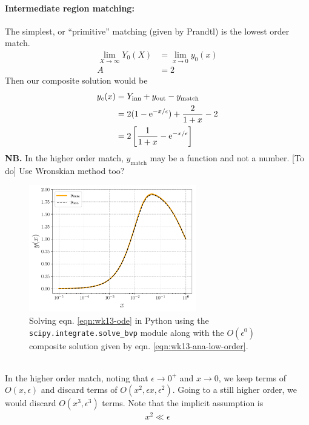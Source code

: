 \paragraph{Intermediate region matching:} The simplest, or ``primitive'' matching (given by Prandtl) is the lowest order match. 
\begin{align*}
	\lim\limits_{X\rightarrow \infty}Y_0(X) &= \lim\limits_{x \rightarrow 0} y_0(x) \\
	A &= 2
\end{align*}
Then our composite solution would be
\begin{align}
	y_c(x) &= Y_\text{inn} + y_\text{out} - y_\text{match} \nonumber \\
	&= 2(1-\mathrm{e}^{-x/\epsilon}) + \frac{2}{1+x} - 2 \nonumber \\
	&= 2\left[\frac{1}{1+x} - \mathrm{e}^{-x/\epsilon}\right] \label{eqn:wk13-ana-low-order}
\end{align}
{\bf NB.} In the higher order match, $y_\text{match}$ may be a function and not a number. {\color{red} [To do]} Use Wronskian method too? 
\begin{figure}[!h]
	\centering
	\includegraphics[width=0.65\textwidth]{./plots/pdf/strogatz-wk13.pdf}
	\caption{Solving eqn. \ref{eqn:wk13-ode} in Python using the \texttt{scipy.integrate.solve\_bvp} module along with the $O(\epsilon^0)$ composite solution given by eqn. \ref{eqn:wk13-ana-low-order}.}
	\label{fig:strogatz-wk13}
\end{figure} \\
In the higher order match, noting that $\epsilon \rightarrow 0^+$ and $x \rightarrow 0$, we keep terms of $O(x,\epsilon)$ and discard terms of $O(x^2, \epsilon x, \epsilon^2)$. Going to a still higher order, we would discard $O(x^3,\epsilon^3)$ terms. Note that the implicit assumption is
\begin{gather*}
	x^2 \ll \epsilon
\end{gather*}
